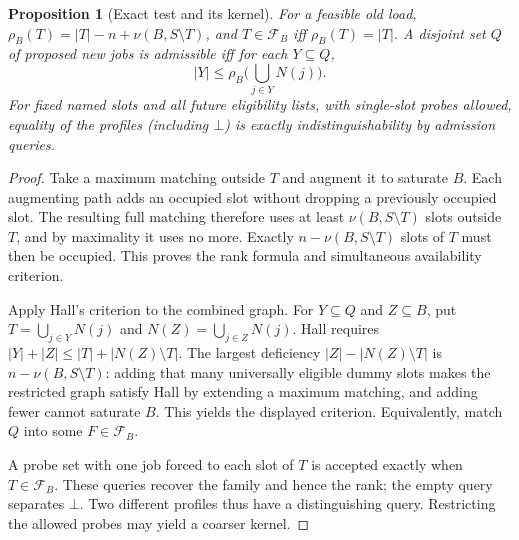 \documentclass[11pt]{article}
\newtheorem{proposition}{Proposition}
\begin{document}
\begin{proposition}[Exact test and its kernel]
For a feasible old load, $\rho_B(T)=|T|-n+\nu(B,S\setminus T)$, and $T\in\mathcal F_B$ iff $\rho_B(T)=|T|$. A disjoint set $Q$ of proposed new jobs is admissible iff for each $Y\subseteq Q$,
\[
    |Y|\le \rho_B\biggl(\bigcup_{j\in Y}N(j)\biggr).
\]
For fixed named slots and all future eligibility lists, with single-slot probes allowed, equality of the profiles (including $\bot$) is exactly indistinguishability by admission queries.
\end{proposition}
\begin{proof}
Take a maximum matching outside $T$ and augment it to saturate $B$. Each augmenting path adds an occupied slot without dropping a previously occupied slot. The resulting full matching therefore uses at least $\nu(B,S\setminus T)$ slots outside $T$, and by maximality it uses no more. Exactly $n-\nu(B,S\setminus T)$ slots of $T$ must then be occupied. This proves the rank formula and simultaneous availability criterion.

Apply Hall's criterion to the combined graph. For $Y\subseteq Q$ and $Z\subseteq B$, put $T=\bigcup_{j\in Y}N(j)$ and $N(Z)=\bigcup_{j\in Z}N(j)$. Hall requires $|Y|+|Z|\le |T|+|N(Z)\setminus T|$. The largest deficiency $|Z|-|N(Z)\setminus T|$ is $n-\nu(B,S\setminus T)$: adding that many universally eligible dummy slots makes the restricted graph satisfy Hall by extending a maximum matching, and adding fewer cannot saturate $B$. This yields the displayed criterion. Equivalently, match $Q$ into some $F\in\mathcal F_B$.

A probe set with one job forced to each slot of $T$ is accepted exactly when $T\in\mathcal F_B$. These queries recover the family and hence the rank; the empty query separates $\bot$. Two different profiles thus have a distinguishing query. Restricting the allowed probes may yield a coarser kernel.
\end{proof}
\end{document}
